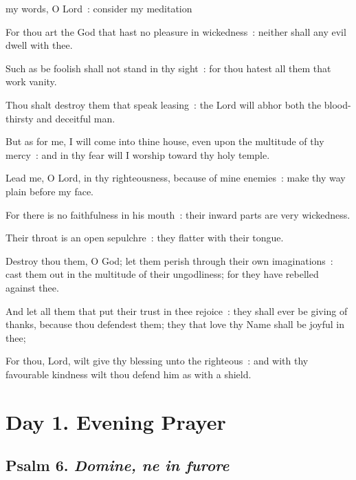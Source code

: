  my words, O Lord~: consider my meditation\par
{}
For thou art the God that hast no pleasure in wickedness~: neither shall any evil dwell with thee.\par
{}Such as be foolish shall not stand in thy sight~: for thou hatest all them that work vanity.\par
{}Thou shalt destroy them that speak leasing~: the Lord will abhor both the blood-thirsty and deceitful man.\par
{}But as for me, I will come into thine house, even upon the multitude of thy mercy~: and in thy fear will I worship toward thy holy temple.\par
{}Lead me, O Lord, in thy righteousness, because of mine enemies~: make thy way plain before my face.\par
{}For there is no faithfulness in his mouth~: their inward parts are very wickedness.\par
{}Their throat is an open sepulchre~: they flatter with their tongue.\par
{}Destroy thou them, O God; let them perish through their own imaginations~: cast them out in the multitude of their ungodliness; for they have rebelled against thee.\par
{}And let all them that put their trust in thee rejoice~: they shall ever be giving of thanks, because thou defendest them; they that love thy Name shall be joyful in thee;\par
{}For thou, Lord, wilt give thy blessing unto the righteous~: and with thy favourable kindness wilt thou defend him as with a shield.\par

\section*{Day 1. Evening Prayer}

\subsection{Psalm 6. \textit{Domine, ne in furore}}

